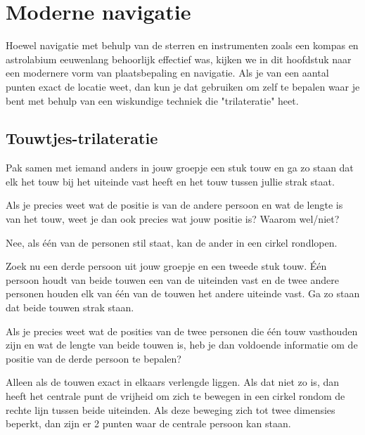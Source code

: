 \chapter{Moderne navigatie}

Hoewel navigatie met behulp van de sterren en instrumenten zoals een kompas en astrolabium eeuwenlang behoorlijk effectief was, kijken we in dit hoofdstuk naar een modernere vorm van plaatsbepaling en navigatie. Als je van een aantal punten exact de locatie weet, dan kun je dat gebruiken om zelf te bepalen waar je bent met behulp van een wiskundige techniek die "trilateratie" heet.

\section{Touwtjes-trilateratie}

\begin{opgave}
	Pak samen met iemand anders in jouw groepje een stuk touw en ga zo staan dat elk het touw bij het uiteinde vast heeft en het touw tussen jullie strak staat.

	Als je precies weet wat de positie is van de andere persoon en wat de lengte is van het touw, weet je dan ook precies wat jouw positie is? Waarom wel/niet?
	\begin{antwoord}
		Nee, als \'e\'en van de personen stil staat, kan de ander in een cirkel rondlopen.
	\end{antwoord}
\end{opgave}

\begin{opgave}
	Zoek nu een derde persoon uit jouw groepje en een tweede stuk touw. \'E\'en persoon houdt van beide touwen een van de uiteinden vast en de twee andere personen houden elk van \'e\'en van de touwen het andere uiteinde vast. Ga zo staan dat beide touwen strak staan.

	Als je precies weet wat de posities van de twee personen die \'e\'en touw vasthouden zijn en wat de lengte van beide touwen is, heb je dan voldoende informatie om de positie van de derde persoon te bepalen?
	\begin{antwoord}
		Alleen als de touwen exact in elkaars verlengde liggen. Als dat niet zo is, dan heeft het centrale punt de vrijheid om zich te bewegen in een cirkel rondom de rechte lijn tussen beide uiteinden. Als deze beweging zich tot twee dimensies beperkt, dan zijn er 2 punten waar de centrale persoon kan staan.
	\end{antwoord}
\end{opgave}

